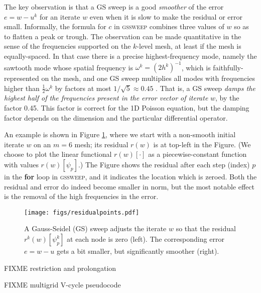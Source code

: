 \documentclass[letterpaper,final,12pt,reqno]{amsart}
\begin{document}
The key observation is that a GS sweep is a good \emph{smoother} of the error $e=w-u^k$ for an iterate $w$ even when it is slow to make the residual or error small.  Informally, the formula for $c$ in \textsc{gssweep} combines three values of $w$ so as to flatten a peak or trough.  The observation can be made quantitative in the sense of the frequencies supported on the $k$-level mesh, at least if the mesh is equally-spaced.  In that case there is a precise highest-frequency mode, namely the sawtooth mode whose spatial frequency is $\omega^k=(2h^k)^{-1}$, which is faithfully-represented on the mesh, and one GS sweep multiplies all modes with frequencies higher than $\frac{1}{2} \omega^k$ by factors at most $1/\sqrt{5}\approx 0.45$ \cite[Chapter 4]{Briggsetal2000}.  That is, a GS sweep \emph{damps the highest half of the frequencies present in the error vector of iterate} $w$, by the factor 0.45.  This factor is correct for the 1D Poisson equation, but the damping factor depends on the dimension and the particular differential operator.

An example is shown in Figure \ref{fig:residualpoints}, where we start with a non-smooth initial iterate $w$ on an $m=6$ mesh; its residual $r(w)$ is at top-left in the Figure.  (We choose to plot the linear functional $r(w)[\cdot]$ as a piecewise-constant function with values $r(w)[\psi_p]$.)  The Figure shows the residual after each step (index) $p$ in the \textbf{for} loop in \textsc{gssweep}, and it indicates the location which is zeroed.  Both the residual and error do indeed become smaller in norm, but the most notable effect is the removal of the high frequencies in the error.

\begin{figure}
\texttt{[image: figs/residualpoints.pdf]}
\caption{A Gauss-Seidel (GS) sweep adjusts the iterate $w$ so that the residual $r^k(w)[\psi_p^k]$ at each node is zero (left).  The corresponding error $e=w-u$ gets a bit smaller, but significantly smoother (right).}
\label{fig:residualpoints}
\end{figure}

FIXME restriction and prolongation

FIXME multigrid V-cycle pseudocode
\end{document}
